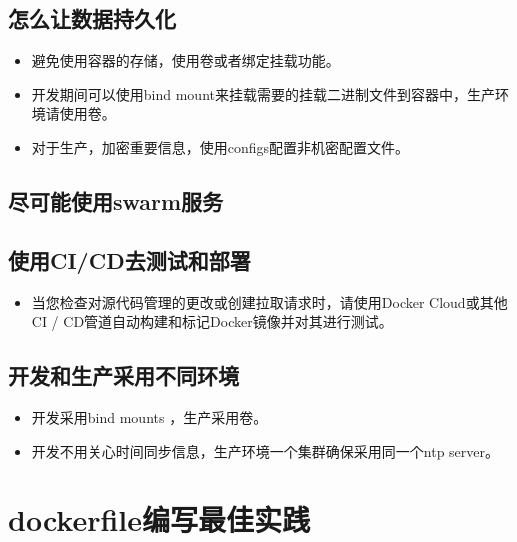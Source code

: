 \documentclass[letterpaper,10pt,english]{sphinxmanual}
\begin{document}
\section{怎么让数据持久化}
\label{\detokenize{_u8fd0_u884c_u5e94_u7528/01-_u90e8_u7f72_u5e94_u7528:id2}}\begin{itemize}
\item {} 
避免使用容器的存储，使用卷或者绑定挂载功能。

\item {} 
开发期间可以使用bind mount来挂载需要的挂载二进制文件到容器中，生产环境请使用卷。

\item {} 
对于生产，加密重要信息，使用configs配置非机密配置文件。

\end{itemize}


\section{尽可能使用swarm服务}
\label{\detokenize{_u8fd0_u884c_u5e94_u7528/01-_u90e8_u7f72_u5e94_u7528:swarm}}

\section{使用CI/CD去测试和部署}
\label{\detokenize{_u8fd0_u884c_u5e94_u7528/01-_u90e8_u7f72_u5e94_u7528:ci-cd}}\begin{itemize}
\item {} 
当您检查对源代码管理的更改或创建拉取请求时，请使用Docker Cloud或其他CI / CD管道自动构建和标记Docker镜像并对其进行测试。

\end{itemize}


\section{开发和生产采用不同环境}
\label{\detokenize{_u8fd0_u884c_u5e94_u7528/01-_u90e8_u7f72_u5e94_u7528:id3}}\begin{itemize}
\item {} 
开发采用bind mounts ，生产采用卷。

\item {} 
开发不用关心时间同步信息，生产环境一个集群确保采用同一个ntp server。

\end{itemize}


\chapter{dockerfile编写最佳实践}
\label{\detokenize{_u8fd0_u884c_u5e94_u7528/02-dockerfile_u7f16_u5199_u6700_u4f73_u5b9e_u8df5::doc}}\label{\detokenize{_u8fd0_u884c_u5e94_u7528/02-dockerfile_u7f16_u5199_u6700_u4f73_u5b9e_u8df5:dockerfile}}
\end{document}
